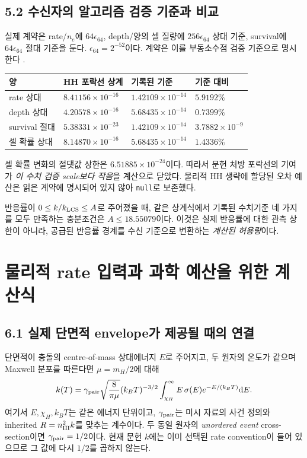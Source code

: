 \documentclass[11pt,a4paper]{article}
\newcommand{\dd}{\mathrm d}\newcommand{\HH}{\mathrm{HH}}\newcommand{\eV}{\mathrm{eV}}
\begin{document}
\subsection*{5.2 수신자의 알고리즘 검증 기준과 비교}
실제 계약은 rate/$n_e$에 $64\epsilon_{64}$, depth/양의 셀 질량에 $256\epsilon_{64}$ 상대 기준, survival에 $64\epsilon_{64}$ 절대 기준을 둔다. $\epsilon_{64}=2^{-52}$이다. 계약은 이를 부동소수점 검증 기준으로 명시한다 \cite{basscontract}.
\begin{center}\begin{tabular}{@{}llll@{}}\toprule
양 & HH 포락선 상계 & 기록된 기준 & 기준 대비\\\midrule
rate 상대 & $8.41156\times10^{-16}$ & $1.42109\times10^{-14}$ & $5.9192\%$\\
depth 상대 & $4.20578\times10^{-16}$ & $5.68435\times10^{-14}$ & $0.7399\%$\\
survival 절대 & $5.38331\times10^{-23}$ & $1.42109\times10^{-14}$ & $3.7882\times10^{-9}$\\
셀 확률 상대 & $8.14870\times10^{-16}$ & $5.68435\times10^{-14}$ & $1.4336\%$\\\bottomrule
\end{tabular}\end{center}
셀 확률 변화의 절댓값 상한은 $6.51885\times10^{-24}$이다. 따라서 문헌 처방 포락선의 기여가 \emph{이 수치 검증 scale보다 작음}을 계산으로 닫았다. 물리적 HH 생략에 할당된 오차 예산은 읽은 계약에 명시되어 있지 않아 \texttt{null}로 보존했다.

반응률이 $0\le k/k_{\rm LCS}\le A$로 주어졌을 때, 같은 상계식에서 기록된 수치기준 네 가지를 모두 만족하는 충분조건은 $A\le18.55079$이다. 이것은 실제 반응률에 대한 관측 상한이 아니라, 공급된 반응률 경계를 수신 기준으로 변환하는 \emph{계산된 허용량}이다.

\newpage
\section{물리적 rate 입력과 과학 예산을 위한 계산식}
\subsection*{6.1 실제 단면적 envelope가 제공될 때의 연결}
단면적이 충돌의 centre-of-mass 상대에너지 $E$로 주어지고, 두 원자의 온도가 같으며 Maxwell 분포를 따른다면 $\mu=m_H/2$에 대해
\begin{equation}
 k(T)=\gamma_{\rm pair}\sqrt{\frac8{\pi\mu}}(k_BT)^{-3/2}
 \int_{\chi_H}^{\infty}E\,\sigma(E)e^{-E/(k_BT)}\dd E.
\end{equation}
여기서 $E,\chi_H,k_BT$는 같은 에너지 단위이고, $\gamma_{\rm pair}$는 미시 자료의 사건 정의와 inherited $R=n_{\rm HI}^2k$를 맞추는 계수이다. 두 동일 원자의 \emph{unordered event} cross-section이면 $\gamma_{\rm pair}=1/2$이다. 현재 문헌 $k$에는 이미 선택된 rate convention이 들어 있으므로 그 값에 다시 $1/2$를 곱하지 않는다.
\end{document}
